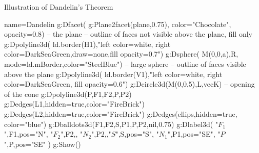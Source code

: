 \begin{demo}{Illustration of Dandelin's Theorem}
\begin{luadraw}{name=Dandelin}
g:Dfacet( g:Plane2facet(plane,0.75), {color="Chocolate", opacity=0.8}) -- the plane
 -- outline of faces not visible above the plane, fill only
g:Dpolyline3d( ld.border(H1),"left color=white, right color=DarkSeaGreen,draw=none,fill opacity=0.7")
g:Dsphere( M(0,0,a),R, {mode=ld.mBorder,color="SteelBlue"}) -- large sphere
 -- outline of faces visible above the plane
g:Dpolyline3d( ld.border(V1),"left color=white, right color=DarkSeaGreen, fill opacity=0.6")
g:Dcircle3d(M(0,0,5),L,vecK) -- opening of the cone
g:Dpolyline3d({{P,F1},{F2,P,P2}})
g:Dedges(L1,{hidden=true,color="FireBrick"})
g:Dedges(L2,{hidden=true,color="FireBrick"})
g:Dedges(ellips,{hidden=true, color="blue"})
g:Dballdots3d({F1,F2,S,P1,P,P2},nil,0.75)
g:Dlabel3d( "$F_1$",F1,{pos="N"}, "$F_2$",F2,{}, "$N_2$",P2,{},"$S$",S,{pos="S"}, 
 "$N_1$",P1,{pos="SE"}, "$P$",P,{pos="SE"} )
g:Show()
\end{luadraw}
\end{demo}

